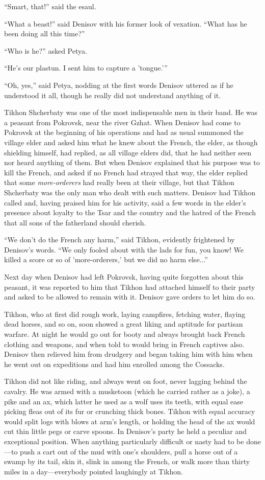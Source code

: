 ``Smart, that!'' said the esaul.

``What a beast!'' said Denisov with his former look of
vexation. ``What has he been doing all this time?''

``Who is he?'' asked Petya.

``He's our plastun. I sent him to capture a 'tongue.'{}''

``Oh, yes,'' said Petya, nodding at the first words Denisov
uttered as if he understood it all, though he really did not
understand anything of it.

Tikhon Shcherbaty was one of the most indispensable men in their
band.  He was a peasant from Pokrovsk, near the river Gzhat. When
Denisov had come to Pokrovsk at the beginning of his operations
and had as usual summoned the village elder and asked him what he
knew about the French, the elder, as though shielding himself,
had replied, as all village elders did, that he had neither seen
nor heard anything of them. But when Denisov explained that his
purpose was to kill the French, and asked if no French had
strayed that way, the elder replied that some
\emph{more-orderers} had really been at their village, but that
Tikhon Shcherbaty was the only man who dealt with such
matters. Denisov had Tikhon called and, having praised him for
his activity, said a few words in the elder's presence about
loyalty to the Tsar and the country and the hatred of the French
that all sons of the fatherland should cherish.

``We don't do the French any harm,'' said Tikhon, evidently
frightened by Denisov's words. ``We only fooled about with the
lads for fun, you know!  We killed a score or so of
'more-orderers,' but we did no harm else...''

Next day when Denisov had left Pokrovsk, having quite forgotten
about this peasant, it was reported to him that Tikhon had
attached himself to their party and asked to be allowed to remain
with it. Denisov gave orders to let him do so.

Tikhon, who at first did rough work, laying campfires, fetching
water, flaying dead horses, and so on, soon showed a great liking
and aptitude for partisan warfare. At night he would go out for
booty and always brought back French clothing and weapons, and
when told to would bring in French captives also. Denisov then
relieved him from drudgery and began taking him with him when he
went out on expeditions and had him enrolled among the Cossacks.

Tikhon did not like riding, and always went on foot, never
lagging behind the cavalry. He was armed with a musketoon (which
he carried rather as a joke), a pike and an ax, which latter he
used as a wolf uses its teeth, with equal ease picking fleas out
of its fur or crunching thick bones. Tikhon with equal accuracy
would split logs with blows at arm's length, or holding the head
of the ax would cut thin little pegs or carve spoons. In
Denisov's party he held a peculiar and exceptional position. When
anything particularly difficult or nasty had to be done---to push
a cart out of the mud with one's shoulders, pull a horse out of a
swamp by its tail, skin it, slink in among the French, or walk
more than thirty miles in a day---everybody pointed laughingly at
Tikhon.

